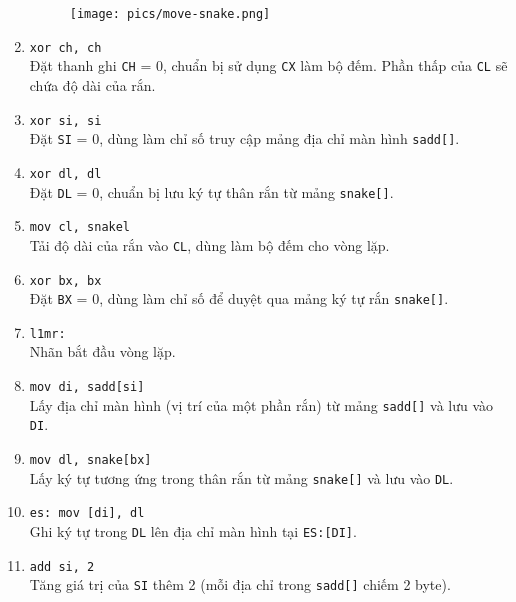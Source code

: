 \documentclass[12pt]{article}
\begin{document}
\begin{enumerate}[label=\textbf{\arabic*.}]
    \begin{figure}[H]
  \centering
  \texttt{[image: pics/move-snake.png]}
\end{figure}
    \item \texttt{xor ch, ch} \\
    Đặt thanh ghi \texttt{CH} = 0, chuẩn bị sử dụng \texttt{CX} làm bộ đếm. Phần thấp của \texttt{CL} sẽ chứa độ dài của rắn.
    
    \item \texttt{xor si, si} \\
    Đặt \texttt{SI} = 0, dùng làm chỉ số truy cập mảng địa chỉ màn hình \texttt{sadd[]}.
    
    \item \texttt{xor dl, dl} \\
    Đặt \texttt{DL} = 0, chuẩn bị lưu ký tự thân rắn từ mảng \texttt{snake[]}.
    
    \item \texttt{mov cl, snakel} \\
    Tải độ dài của rắn vào \texttt{CL}, dùng làm bộ đếm cho vòng lặp.

    \item \texttt{xor bx, bx} \\
    Đặt \texttt{BX} = 0, dùng làm chỉ số để duyệt qua mảng ký tự rắn \texttt{snake[]}.
    
    \item \texttt{l1mr:} \\
    Nhãn bắt đầu vòng lặp.

    \item \texttt{mov di, sadd[si]} \\
    Lấy địa chỉ màn hình (vị trí của một phần rắn) từ mảng \texttt{sadd[]} và lưu vào \texttt{DI}.
    
    \item \texttt{mov dl, snake[bx]} \\
    Lấy ký tự tương ứng trong thân rắn từ mảng \texttt{snake[]} và lưu vào \texttt{DL}.
    
    \item \texttt{es: mov [di], dl} \\
    Ghi ký tự trong \texttt{DL} lên địa chỉ màn hình tại \texttt{ES:[DI]}.

    \item \texttt{add si, 2} \\
    Tăng giá trị của \texttt{SI} thêm 2 (mỗi địa chỉ trong \texttt{sadd[]} chiếm 2 byte).


\end{enumerate}
\end{document}
